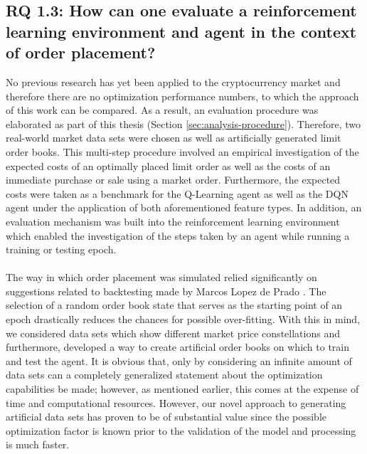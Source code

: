 \subsection{RQ 1.3: How can one evaluate a reinforcement learning environment and agent in the context of order placement?}

    No previous research has yet been applied to the cryptocurrency market and therefore there are no optimization performance numbers, to which the approach of this work can be compared. 
    As a result, an evaluation procedure was elaborated as part of this thesis (Section \ref{sec:analysis-procedure}).
    Therefore, two real-world market data sets were chosen as well as artificially generated limit order books.
    This multi-step procedure involved an empirical investigation of the expected costs of an optimally placed limit order as well as the costs of an immediate purchase or sale using a market order.
    Furthermore, the expected costs were taken as a benchmark for the Q-Learning agent as well as the DQN agent under the application of both aforementioned feature types.
    In addition, an evaluation mechanism was built into the reinforcement learning environment which enabled the investigation of the steps taken by an agent while running a training or testing epoch.
    \\
    \\
    The way in which order placement was simulated relied significantly on suggestions related to backtesting made by Marcos Lopez de Prado \cite{de2018advances}.
    The selection of a random order book state that serves as the starting point of an epoch drastically reduces the chances for possible over-fitting.
    With this in mind, we considered data sets which show different market price constellations and furthermore, developed a way to create artificial order books on which to train and test the agent.
    It is obvious that, only by considering an infinite amount of data sets can a completely generalized statement about the optimization capabilities be made; however, as mentioned earlier, this comes at the expense of time and computational resources.
    However, our novel approach to generating artificial data sets has proven to be of substantial value since the possible optimization factor is known prior to the validation of the model and processing is much faster.
    
